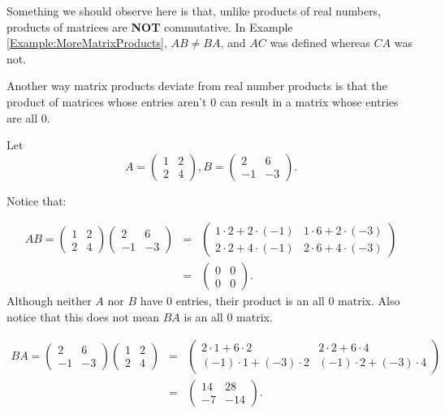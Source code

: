 Something we should observe here is that, unlike products of real numbers, products of matrices are \textbf{NOT} commutative.  In Example \ref{Example:MoreMatrixProducts}, $AB\neq BA$, and $AC$ was defined whereas $CA$ was not.

Another way matrix products deviate from real number products is that the product of matrices whose entries aren't 0 can result in a matrix whose entries are all 0.

\begin{example}
Let $$A=\begin{pmatrix}1&2\\2&4 \end{pmatrix}, B=\begin{pmatrix}2&6\\-1&-3 \end{pmatrix}.$$

Notice that:

\begin{eqnarray*}
AB=\begin{pmatrix}1&2\\2&4 \end{pmatrix}\begin{pmatrix}2&6\\-1&-3 \end{pmatrix}&=&\begin{pmatrix}
1\cdot 2+2\cdot(-1) & 1\cdot 6+2\cdot(-3)\\ 2\cdot 2+4\cdot(-1)&2\cdot 6 +4\cdot(-3)
\end{pmatrix}\\
&=&\begin{pmatrix}
0 & 0 \\ 0 & 0
\end{pmatrix}.
\end{eqnarray*}
Although neither $A$ nor $B$ have 0 entries, their product is an all 0 matrix.  Also notice that this does not mean $BA$ is an all 0 matrix.

\begin{eqnarray*}
BA=\begin{pmatrix}2&6\\-1&-3 \end{pmatrix}\begin{pmatrix}1&2\\2&4 \end{pmatrix}&=&\begin{pmatrix}
2\cdot 1+6\cdot2 & 2\cdot 2+6\cdot4\\ (-1)\cdot 1+(-3)\cdot2&(-1)\cdot 2 +(-3)\cdot4
\end{pmatrix}\\
&=&\begin{pmatrix}
14 & 28 \\ -7 & -14
\end{pmatrix}.
\end{eqnarray*}

\end{example}






